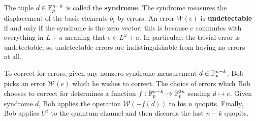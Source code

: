 The tuple $d \in \mathbb{F}_p^{n-k}$ is called the {\bf syndrome}. The syndrome measures the displacement of the basis elements $b_i$ by errors.
An error $W(e)$ is {\bf undetectable} if and only if the syndrome is the zero vector; this is because $e$ commutes with everything in $L+a$ meaning that $e \in L^\omega+a$.  In particular, the trivial error is undetectable; so undetectable errors are indistinguishable from having no errors at all.

%
%
To correct for errors, given any nonzero syndrome measurement $d\in \mathbb{F}_p^{n-k}$, Bob picks an error ${\mathcal W}(e)$ which he wishes to correct. The choice of errors which Bob chooses to correct for determines a function $f:\mathbb{F}_p^{n-k}\to\mathbb{F}_p^{2n}$ sending $d\mapsto e$.
Given syndrome $d$, Bob applies the operation ${\mathcal W}(-f(d))$ to his $n$ quopits. Finally, Bob applies  $U^\dag$  to the quantum channel and then discards the last $n-k$ quopits.


